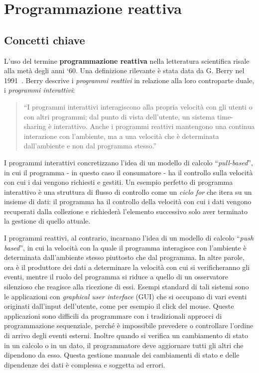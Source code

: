 \documentclass[12pt,a4paper,openright,twoside]{book}
\begin{document}
\chapter{Programmazione reattiva}
\section{Concetti chiave}
L'uso del termine \textbf{programmazione reattiva} nella letteratura scientifica risale alla metà degli anni `60. Una definizione rilevante è stata data da G. Berry nel 1991~\cite{DBLP:journals/pieee/BenvenisteB91}. Berry descrive i \textit{programmi reattivi} in relazione alla loro controparte duale, i \textit{programmi interattivi}: 
\begin{quotation}
    ``I programmi interattivi interagiscono alla propria velocità con gli utenti o con altri programmi; dal punto di vista dell'utente, un sistema time-sharing è interattivo. Anche i programmi reattivi mantengono una continua interazione con l'ambiente, ma a una velocità che è determinata dall'ambiente e non dal programma stesso.''
\end{quotation}
I programmi interattivi concretizzano l'idea di un modello di calcolo ``\textit{pull-based}'', in cui il programma - in questo caso il consumatore - ha il controllo sulla velocità con cui i dai vengono richiesti e gestiti. 
Un esempio perfetto di programma interattivo è una struttura di flusso di controllo come un \textit{ciclo for} che itera su un insieme di dati: il programma ha il controllo della velocità con cui i dati vengono recuperati dalla collezione e richiederà l'elemento successivo solo aver terminato la gestione di quello attuale. 

I programmi reattivi, al contrario, incarnano l'idea di un modello di calcolo ``\textit{push based}'', in cui la velocità con la quale il programma interagisce con l'ambiente è determinata dall'ambiente stesso piuttosto che dal programma. In altre parole, ora è il produttore dei dati a determinare la velocità con cui si verificheranno gli eventi, mentre il ruolo del programma si riduce a quello di un osservatore silenzioso che reagisce alla ricezione di essi. Esempi standard di tali sistemi sono le applicazioni con \textit{graphical user interface} (GUI) che si occupano di vari eventi originati dall'input dell'utente, come per esempio il click del mouse. Queste applicazioni sono difficili da programmare con i tradizionali approcci di programmazione sequenziale, perché è impossibile prevedere o controllare l'ordine di arrivo degli eventi esterni. Inoltre quando si verifica un cambiamento di stato in un calcolo o in un dato, il programmatore deve aggiornare tutti gli altri che dipendono da esso. Questa gestione manuale dei cambiamenti di stato e delle dipendenze dei dati è complessa e soggetta ad errori.
\end{document}
